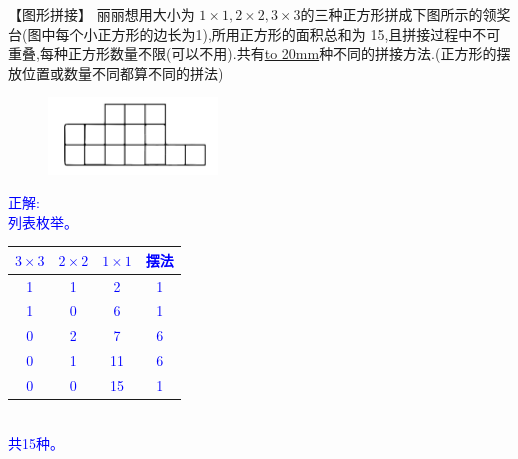 \item {
    【图形拼接】
    丽丽想用大小为 $1\times 1, 2\times 2, 3\times 3$的三种正方形拼成下图所示的领奖台(图中每个小正方形的边长为1),所用正方形的面积总和为 15,且拼接过程中不可重叠,每种正方形数量不限(可以不用).共有\underline{\hbox to 20mm{}}种不同的拼接方法.(正方形的摆放位置或数量不同都算不同的拼法)
    \begin{figure}[H] 
        \centering
        \includegraphics[width=0.4\textwidth]{./pics/Chapter_4/9.png}
    \end{figure}
    \ifshowSolution 
        \fangsong{}\textcolor{blue}{
            正解: \\
            列表枚举。\\
            \begin{tabular}{|c|c|c|c|}
                \hline
                $3\times 3$ & $2\times 2$ & $1\times 1$ & 摆法 \\
                \hline
                1 & 1 & 2 & 1 \\
                1 & 0 & 6 & 1 \\
                0 & 2 & 7 & 6 \\
                0 & 1 & 11 & 6 \\
                0 & 0 & 15 & 1 \\
                \hline
            \end{tabular} \\
            共15种。
        }
    \else
        \vspace{1cm}
    \fi
}

